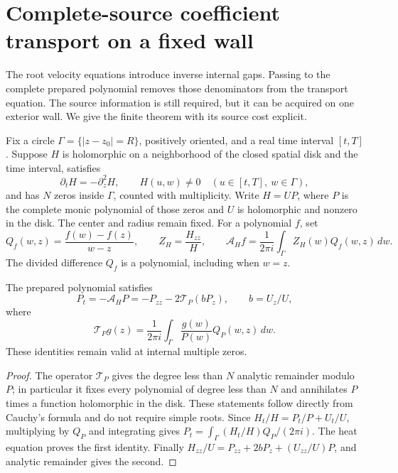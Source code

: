 \section{Complete-source coefficient transport on a fixed wall}
\label{sec:coefficient-transport}

The root velocity equations introduce inverse internal gaps. Passing to the
complete prepared polynomial removes those denominators from the transport
equation. The source information is still required, but it can be acquired on
one exterior wall. We give the finite theorem with its source cost explicit.

Fix a circle $\Gamma=\{|z-z_0|=R\}$, positively oriented, and a real time
interval $[t,T]$. Suppose $H$ is holomorphic on a neighborhood of the closed
spatial disk and the time interval, satisfies
\begin{equation}\label{eq:heat-fixed-wall}
 \partial_tH=-\partial_z^2H,
 \qquad H(u,w)\ne0\quad(u\in[t,T],\ w\in\Gamma),
\end{equation}
and has $N$ zeros inside $\Gamma$, counted with multiplicity. Write
$H=UP$, where $P$ is the complete monic polynomial of those zeros and $U$ is
holomorphic and nonzero in the disk. The center and radius remain fixed.
For a polynomial $f$, set
\[
 Q_f(w,z)=\frac{f(w)-f(z)}{w-z},\qquad
 Z_H=\frac{H_{zz}}H,\qquad
 \mathcal A_Hf=\frac1{2\pi i}\int_\Gamma Z_H(w)Q_f(w,z)\,dw.
\]
The divided difference $Q_f$ is a polynomial, including when $w=z$.

\begin{proposition}\label{prop:source-coeff}
The prepared polynomial satisfies
\begin{equation}\label{eq:source-coeff}
 P_t=-\mathcal A_HP=-P_{zz}-2\mathcal T_P(bP_z),
 \qquad b=U_z/U,
\end{equation}
where
\[
 \mathcal T_Pg(z)=\frac1{2\pi i}\int_\Gamma
                   \frac{g(w)}{P(w)}Q_P(w,z)\,dw.
\]
These identities remain valid at internal multiple zeros.
\end{proposition}

\begin{proof}
The operator $\mathcal T_P$ gives the degree less than $N$ analytic remainder
modulo $P$; in particular it fixes every polynomial of degree less than $N$
and annihilates $P$ times a function holomorphic in the disk. These statements
follow directly from Cauchy's formula and do not require simple roots.
Since $H_t/H=P_t/P+U_t/U$, multiplying by $Q_P$ and integrating gives
$P_t=\int_\Gamma(H_t/H)Q_P/(2\pi i)$. The heat equation proves the first
identity. Finally
$H_{zz}/U=P_{zz}+2bP_z+(U_{zz}/U)P$, and analytic remainder gives the second.
\end{proof}


